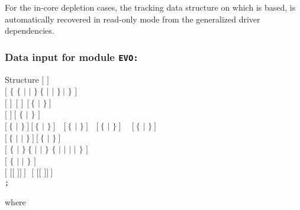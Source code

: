 For the in-core depletion cases, the tracking  data structure on which
 is based, is automatically recovered in read-only mode from the
generalized driver dependencies.

\subsubsection{Data input for module {\tt EVO:}}\label{sect:descevo}

\begin{DataStructure}{Structure }
$[$   $]$ \\
$[$ $\{$   $\{$  $|$  $|$  $\}~\{$
  $|$   $|$   $\}~|$
 $\}$ $]$ \\
$[$   $]~~[$   $]~~[~\{$   $|$  $\}~]$ \\
$[$   $]~[$ $\{$  $|$  $\}$ $]$ \\
$[~\{$  $|$  $\}~]~[~\{$ $|$ $\}~]$~~$[~\{$ $|$ $\}~]$~~$[~\{$ $|$ $\}~]$~~
$[~\{$ $|$ $\}~]$ \\
$[~\{$ $|$  $|$  $\}~]~[~\{$  $|$  $\}~]$ \\
$[$  $\{$  $|$  $\}~\{$  $|$  $|$  $\}$ $\{$  $|$
  $|$   $|$   $|$  $\}$ $]$ \\
$[$   $\{$  $|$  $|$  $\}$ $]$ \\
$[$  $[[$  $]] ~]~~~[$  $[[$  $]] ~]$ \\
{\tt ;}
\end{DataStructure}

\noindent
where

